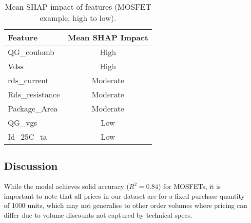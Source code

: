 \begin{table}[H]
\centering
\caption{Mean SHAP impact of features (MOSFET example, high to low).}
\label{tab:mosfet-shap}
\begin{tabular}{lc}
\toprule
Feature & Mean SHAP Impact \\
\midrule
QG\_coulomb         & High \\
Vdss                & High \\
rds\_current        & Moderate \\
Rds\_resistance     & Moderate \\
Package\_Area       & Moderate \\
QG\_vgs             & Low \\
Id\_25C\_ta         & Low \\
\bottomrule
\end{tabular}
\end{table}


\subsection{Discussion}
While the model achieves solid accuracy ($R^2 = 0.84$) for MOSFETs, it is important to note that all prices in our dataset are for a fixed purchase quantity of 1000 units, which may not generalise to other order volumes where pricing can differ due to volume discounts not captured by technical specs.

